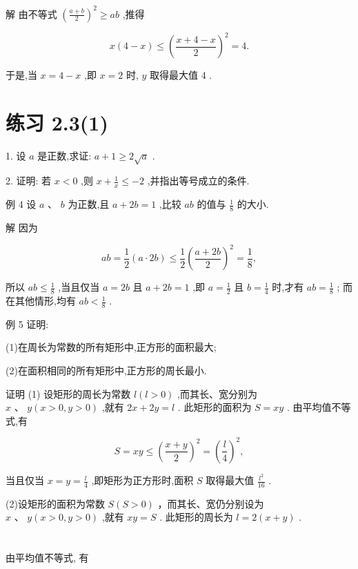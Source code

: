 \documentclass[10pt]{article}
\begin{document}
解 由不等式 \({\left( \frac{a + b}{2}\right) }^{2} \geq  {ab}\) ,推得

\[
x\left( {4 - x}\right)  \leq  {\left( \frac{x + 4 - x}{2}\right) }^{2} = 4.
\]

于是,当 \(x = 4 - x\) ,即 \(x = 2\) 时, \(y\) 取得最大值 4 .

\section*{练习 2.3(1)}

1. 设 \(a\) 是正数,求证: \(a + 1 \geq  2\sqrt{a}\) .

2. 证明: 若 \(x < 0\) ,则 \(x + \frac{1}{x} \leq   - 2\) ,并指出等号成立的条件.

例 4 设 \(a\text{ 、 }b\) 为正数,且 \(a + {2b} = 1\) ,比较 \({ab}\) 的值与 \(\frac{1}{8}\) 的大小.

解 因为

\[
{ab} = \frac{1}{2}\left( {a \cdot  {2b}}\right)  \leq  \frac{1}{2}{\left( \frac{a + {2b}}{2}\right) }^{2} = \frac{1}{8},
\]

所以 \({ab} \leq  \frac{1}{8}\) ,当且仅当 \(a = {2b}\) 且 \(a + {2b} = 1\) ,即 \(a = \frac{1}{2}\) 且 \(b = \frac{1}{4}\) 时,才有 \({ab} = \frac{1}{8}\) ; 而在其他情形,均有 \({ab} < \frac{1}{8}\) .

例 5 证明:

(1)在周长为常数的所有矩形中,正方形的面积最大;

(2)在面积相同的所有矩形中,正方形的周长最小.

证明 (1) 设矩形的周长为常数 \(l\left( {l > 0}\right)\) ,而其长、宽分别为 \(x\text{ 、 }y\left( {x > 0,y > 0}\right)\) ,就有 \({2x} + {2y} = l\) . 此矩形的面积为 \(S = {xy}\) . 由平均值不等式,有

\[
S = {xy} \leq  {\left( \frac{x + y}{2}\right) }^{2} = {\left( \frac{l}{4}\right) }^{2},
\]

当且仅当 \(x = y = \frac{l}{4}\) ,即矩形为正方形时,面积 \(S\) 取得最大值 \(\frac{{l}^{2}}{16}\) .

(2)设矩形的面积为常数 \(S\left( {S > 0}\right)\) ，而其长、宽仍分别设为 \(x\text{ 、 }y\left( {x > 0,y > 0}\right)\) ,就有 \({xy} = S\) . 此矩形的周长为 \(l = 2\left( {x + y}\right)\) .

\section*{}

由平均值不等式, 有
\end{document}

